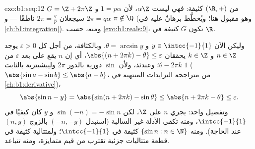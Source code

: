 \begin{solution}{exo:b1:seq:12}
 $G = \Z + 2\pi\Z$ من $(\R, +)$ كثيفة: فهي ليست
$\alpha\Z$، لأن $1 = p\alpha$ و $2\pi = q\alpha$ سيجعلان $2\pi =
\frac qp$ ناطقًا --- و $\pi \notin \Q$ (وهو مقبول هنا؛ ويُخطَّط برهانٌ عليه
في \cref{ch:b1:integration}). ومنه، حسب \cref{exo:b1:reals:9}، تكون $G$
كثيفة في $\R$.

وليكن الآن $y \in \intcc{-1}{1}$ و $\theta = \arcsin y$. وبالكثافة،
من أجل كل $\varepsilon > 0$ يوجد $n \in \Z$ و $k \in \Z$ يحققان
$\abs{(n + 2\pi k) - \theta} \leq \varepsilon$، أي إن $n$ يقع على بعد
$\varepsilon$ من $\theta - 2\pi k$؛ وعندئذ، ولأن $\sin$ دورية بالدور
$2\pi$ وليبشيتزية بالثابت $1$ ($\abs{\sin a - \sin b} \leq
\abs{a - b}$، من متراجحة التزايدات المنتهية في
\cref{ch:b1:derivative})،
\[
\abs{\sin n - y} = \abs{\sin(n + 2\pi k) - \sin\theta}
\leq \abs{n + 2\pi k - \theta} \leq \varepsilon .
\]
وتفصيل واحد: يجري $n$ على $\Z$، لكن $\sin(-n) = -\sin n$ و $y$
كان كيفيًا في $\intcc{-1}{1}$، ومنه تكفي الأدلة غير السالبة
(استبدل $(-n, -y)$ بالزوج $(n, y)$ عند الحاجة). ومنه  $\{\sin n : n \in
\N\}$ كثيفة في $\intcc{-1}{1}$؛ ولمتتالية كثيفة في قطعة
متتاليات جزئية تقترب من قيم متمايزة، ومنه تتباعد.
\end{solution}

